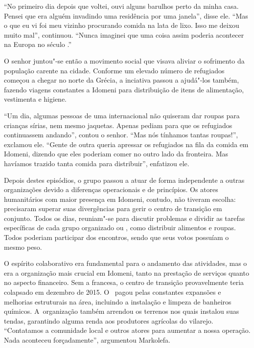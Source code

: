 ``No primeiro dia depois que voltei, ouvi alguns barulhos perto da minha
casa. Pensei que era alguém invadindo uma residência por uma janela'',
disse ele. ``Mas o que eu vi foi meu vizinho procurando comida na lata
de lixo. Isso me deixou muito mal'', continuou. ``Nunca imaginei que uma
coisa assim poderia acontecer na Europa no século .''

O senhor juntou"-se então a movimento social que visava aliviar o
sofrimento da população carente na cidade. Conforme um elevado número de
refugiados começou a chegar no norte da Grécia, a inciativa passou a
ajudá"-los também, fazendo viagens constantes a Idomeni para distribuição
de itens de alimentação, vestimenta e higiene. 

``Um dia, algumas pessoas de uma  internacional não quiseram dar
roupas para crianças sírias, nem mesmo jaquetas. Apenas pediam para que
os refugiados continuassem andando'', contou o senhor. ``Mas nós
tínhamos tantas roupas!'', exclamou ele. ``Gente de outra  queria
apressar os refugiados na fila da comida em Idomeni, dizendo que eles
poderiam comer no outro lado da fronteira. Mas havíamos trazido tanta
comida para distribuir'', enfatizou ele.

Depois destes episódios, o grupo passou a atuar de forma independente a
outras organizações devido a diferenças operacionais e de princípios. Os
atores humanitários com maior presença em Idomeni, contudo, não tiveram
escolha: precisaram superar suas divergências para gerir o centro de
transição em conjunto. Todos os dias, reuniam"-se para discutir problemas
e dividir as tarefas específicas de cada grupo organizado ou , como
distribuir alimentos e roupas. Todos poderiam participar dos encontros,
sendo que seus votos possuíam o mesmo peso.

O espírito colaborativo era fundamental para o andamento das atividades,
mas o  era a organização mais crucial em Idomeni, tanto na prestação
de serviços quanto no aspecto financeiro. Sem a  francesa, o centro
de transição provavelmente teria colapsado em dezembro de 2015. O~
pagou pelas constantes expansões e melhorias estruturais na área,
incluindo a instalação e limpeza de banheiros químicos. A~organização
também arrendou os terrenos nos quais instalou suas tendas, garantindo
alguma renda aos produtores agrícolas do vilarejo. ``Contatamos a
comunidade local e outros atores para aumentar a nossa operação. Nada
aconteceu forçadamente'', argumentou Markolefa.

